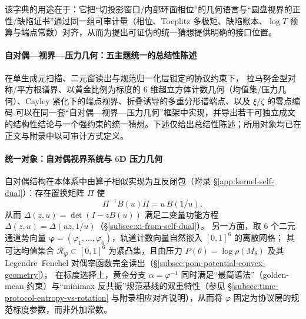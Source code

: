 该字典的用途在于：它把“切投影窗口/内部环面相位”的几何语言与“圆盘视界的正性/缺陷证书”通过同一组可审计量（相位、Toeplitz 多极矩、缺陷账本、\(\log T\) 预算与端点常数）对齐，从而为提出可证伪的统一猜想提供明确的接口位置。

\paragraph{自对偶—视界—压力几何：五主题统一的总结性陈述}
在单生成元扫描、二元窗读出与规范归一化层锁定的协议约束下，
拉马努金型对称/平方根谱界、以黄金比例为标度的 \(6\) 维超立方体计数几何（均值集/压力几何）、Cayley 紧化下的端点视界、折叠诱导的多重分形谱端点、以及 \(\xi/\zeta\) 的零点编码
可以在同一套“自对偶—视界—压力几何”框架中实现，并导出若干可独立成文的结构性结论与一个强约束的统一猜想。下述仅给出总结性陈述；所用对象均已在正文与附录中以可审计方式定义。

\paragraph{统一对象：自对偶视界系统与 \(6\)D 压力几何}
自对偶结构在本体系中由算子相似实现为互反闭包（附录 \S\ref{app:kernel-self-dual}）：存在置换矩阵 \(\Pi\) 使
\[
\Pi^{-1}B(u)\Pi=u\,B(1/u),
\]
从而 \(\Delta(z,u)=\det(I-zB(u))\) 满足二变量功能方程 \(\Delta(z,u)=\Delta(uz,1/u)\)（\S\ref{subsec:xi-from-self-dual}）。
另一方面，取 \(6\) 个二元通道势向量 \(\boldsymbol{\varphi}=(\varphi_1,\dots,\varphi_6)\)，轨道计数向量自然嵌入 \([0,1]^6\) 的离散网格；
其可达均值集合 \(\mathcal{R}_{\boldsymbol{\varphi}}\subset[0,1]^6\) 为紧凸集，且由压力 \(P(\theta)=\log\rho(M_\theta)\) 及其 Legendre--Fenchel 对偶率函数完全读出（\S\ref{subsec:pom-potential-convex-geometry}）。
在标度选择上，黄金分支 \(\alpha=\varphi^{-1}\) 同时满足“最简语法”（golden-mean 约束）与“minimax 反共振”规范基线的双重特性（参见 \S\ref{subsec:time-protocol-entropy-vs-rotation} 与附录相应对齐说明），从而将 \(\varphi\) 固定为协议层的规范标度参数，而非外加常数。


